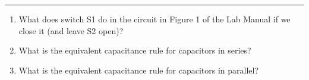\documentclass[11pt]{article}
\begin{document}
\Large

\medskip\hrule\bigskip\bigskip
{}
\begin{enumerate}

\item What does switch S1 do in the circuit in Figure 1 of the Lab Manual if we close it (and leave S2 open)?
  \vspace*{0.27\textheight}
\item What is the equivalent capacitance rule for capacitors in series?
  \vspace*{0.27\textheight}
\item What is the equivalent capacitance rule for capacitors in parallel?
\end{enumerate}
\end{document}
